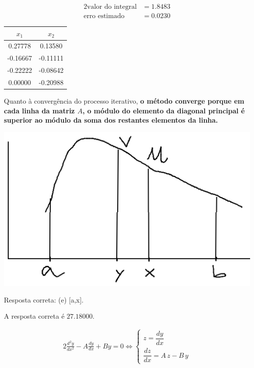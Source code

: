 \setcounter{chapter}{14}
{
\renewcommand{\thesubsection}{\thesection\alph{subsection}}

\begin{alignat*}{2}
	\text{valor do integral} &= 1.8483\\
	\text{erro estimado}     &= 0.0230
\end{alignat*}


\begin{center} \begin{tabular}{c | c}
	$x_1   $ & $x_2$ \\ \hline
	 0.27778 &  0.13580 \\
	-0.16667 & -0.11111 \\
	-0.22222 & -0.08642 \\
	 0.00000 & -0.20988
\end{tabular} \end{center}
Quanto à convergência do processo iterativo, \textbf{o método converge porque em cada linha da matriz $A$, o módulo do elemento da diagonal principal é superior ao módulo da soma dos restantes elementos da linha.}

\begin{center} \includegraphics[scale=0.5]{2015T2_3} \end{center}
Resposta correta: (e) [a,x].

A resposta correta é $27.18000$.

\begin{alignat*}{2}
	\frac{d^2y}{dx^2}-A\frac{dy}{dx}+By=0 \iff
	\begin{cases}
		z = \dfrac{dy}{dx}\\
		\dfrac{dz}{dx}=A\,z-B\,y
	\end{cases}
\end{alignat*}

}